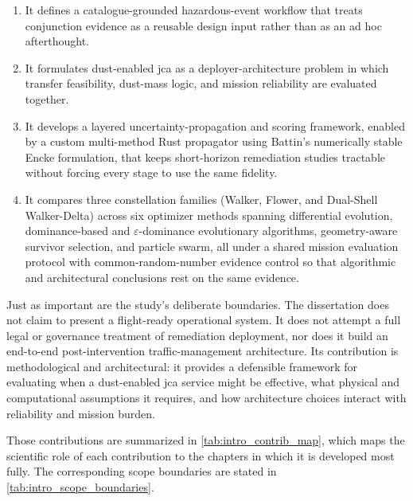\begin{enumerate}
    \item It defines a catalogue-grounded hazardous-event workflow that treats conjunction evidence as a reusable design input rather than as an ad hoc afterthought.
    \item It formulates dust-enabled \gls{jca} as a deployer-architecture problem in which transfer feasibility, dust-mass logic, and mission reliability are evaluated together.
    \item It develops a layered uncertainty-propagation and scoring framework, enabled by a custom multi-method Rust propagator using Battin's numerically stable Encke formulation, that keeps short-horizon remediation studies tractable without forcing every stage to use the same fidelity.
    \item It compares three constellation families (Walker, Flower, and Dual-Shell Walker-Delta) across six optimizer methods spanning differential evolution, dominance-based and \(\varepsilon\)-dominance evolutionary algorithms, geometry-aware survivor selection, and particle swarm, all under a shared mission evaluation protocol with common-random-number evidence control so that algorithmic and architectural conclusions rest on the same evidence.
\end{enumerate}

Just as important are the study's deliberate boundaries. The dissertation does not claim to present a flight-ready operational system. It does not attempt a full legal or governance treatment of remediation deployment, nor does it build an end-to-end post-intervention traffic-management architecture. Its contribution is methodological and architectural: it provides a defensible framework for evaluating when a dust-enabled \gls{jca} service might be effective, what physical and computational assumptions it requires, and how architecture choices interact with reliability and mission burden.

Those contributions are summarized in \cref{tab:intro_contrib_map}, which maps the scientific role of each contribution to the chapters in which it is developed most fully. The corresponding scope boundaries are stated in \cref{tab:intro_scope_boundaries}.

